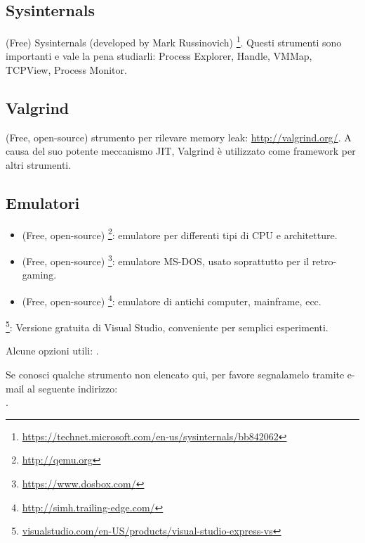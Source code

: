 \subsection{Sysinternals}

(Free) Sysinternals (developed by Mark Russinovich)
\footnote{\url{https://technet.microsoft.com/en-us/sysinternals/bb842062}}.
Questi strumenti sono importanti e vale la pena studiarli: Process Explorer, Handle, VMMap, TCPView, Process Monitor.

\subsection{Valgrind}

(Free, open-source) strumento per rilevare memory leak: \url{http://valgrind.org/}.
A causa del suo potente meccanismo \ac{JIT}, Valgrind è utilizzato come framework per altri strumenti.


\subsection{Emulatori}

\begin{itemize}
\item (Free, open-source) \footnote{\url{http://qemu.org}}: emulatore per differenti tipi di CPU e architetture.

\item (Free, open-source) \footnote{\url{https://www.dosbox.com/}}: emulatore MS-DOS, usato soprattutto per il retro-gaming.

\item (Free, open-source) \footnote{\url{http://simh.trailing-edge.com/}}: emulatore di antichi computer, mainframe, ecc.
\end{itemize}


\footnote{\href{http://go.yurichev.com/17034}{visualstudio.com/en-US/products/visual-studio-express-vs}}:
Versione gratuita di Visual Studio, conveniente per semplici esperimenti.

Alcune opzioni utili: .



Se conosci qualche strumento non elencato qui, per favore segnalamelo tramite e-mail al seguente indirizzo:\\
\TT{\EMAIL}.


